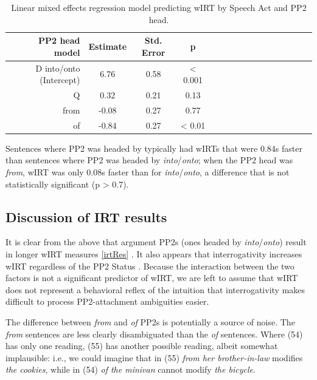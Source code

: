 \documentclass[12pt,oneside]{book}
\begin{document}
\begin{table}[!h]

\caption{\label{tab:pp2hd}Linear mixed effects regression model predicting wIRT by Speech Act and PP2 head.}
\centering
\begin{tabular}{rcccrcccrcccrccc}
\toprule
PP2 head model & Estimate & Std. Error & p\\
\midrule
D into/onto (Intercept) & 6.76 & 0.58 & < 0.001\\
Q & 0.32 & 0.21 & 0.13\\
from & -0.08 & 0.27 & 0.77\\
of & -0.84 & 0.27 & < 0.01\\
\bottomrule
\end{tabular}
\end{table}

Sentences where PP2 was headed by \emph{} typically had wIRTs that were 0.84s faster than sentences where PP2 was headed by \emph{into}/\emph{onto}; when the PP2 head was \emph{from}, wIRT was only 0.08s faster than for \emph{into}/\emph{onto}, a difference that is not statistically significant (p \textgreater{} 0.7).

\hypertarget{irtdiscuss}{%
\subsection{Discussion of IRT results}\label{irtdiscuss}}

It is clear from the above that  argument PP2s  (ones headed by \emph{into}/\emph{onto}) result in longer wIRT measures  \ref{irtRes} \added{)}. It also appears that interrogativity increases wIRT  regardless of the PP2 Status . Because the interaction between the two factors is not a significant predictor of wIRT, we are left to assume that wIRT does not represent a behavioral reflex of the intuition that interrogativity makes difficult to process PP2-attachment ambiguities easier.

The difference between \emph{from} and \emph{of} PP2s is potentially a source of noise. The \emph{from} sentences are less clearly disambiguated than the \emph{of} sentences. Where (54) has only one reading, (55) has another possible reading, albeit somewhat implausible: i.e., we could imagine that in (55) \emph{from her brother-in-law} modifies \emph{the cookies}, while in (54) \emph{of the minivan} cannot modify \emph{the bicycle}.
\end{document}
